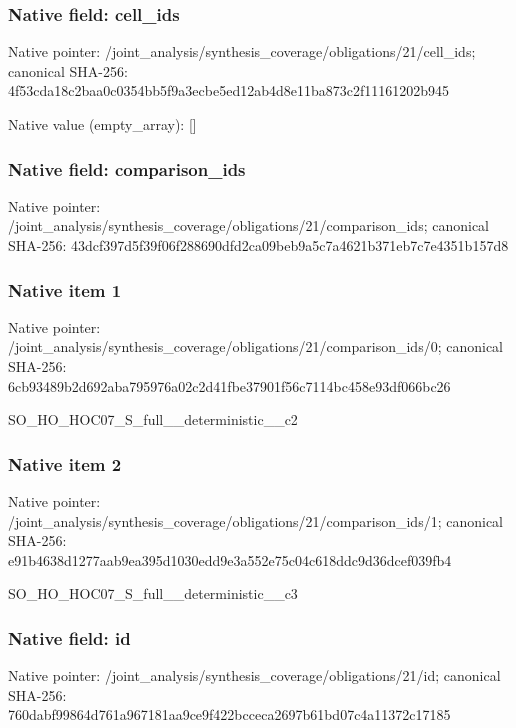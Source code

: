 \documentclass[10pt,a4paper]{article}
\begin{document}
\subsubsection{Native field: cell\_\allowbreak{}ids}
Native pointer: /joint\_\allowbreak{}analysis/synthesis\_\allowbreak{}coverage/obligations/21/cell\_\allowbreak{}ids; canonical SHA-256: 4f53cda18c2baa0c0354bb5f9a3ecbe5ed12ab4d8e11ba873c2f11161202b945

Native value (empty\_\allowbreak{}array): []

\subsubsection{Native field: comparison\_\allowbreak{}ids}
Native pointer: /joint\_\allowbreak{}analysis/synthesis\_\allowbreak{}coverage/obligations/21/comparison\_\allowbreak{}ids; canonical SHA-256: 43dcf397d5f39f06f288690dfd2ca09beb9a5c7a4621b371eb7c7e4351b157d8

\subsubsection{Native item 1}
Native pointer: /joint\_\allowbreak{}analysis/synthesis\_\allowbreak{}coverage/obligations/21/comparison\_\allowbreak{}ids/0; canonical SHA-256: 6cb93489b2d692aba795976a02c2d41fbe37901f56c7114bc458e93df066bc26

\begingroup\raggedright\sloppy SO\_\allowbreak{}HO\_\allowbreak{}HOC07\_\allowbreak{}S\_\allowbreak{}full\_\allowbreak{}\_\allowbreak{}deterministic\_\allowbreak{}\_\allowbreak{}c2\par\endgroup

\subsubsection{Native item 2}
Native pointer: /joint\_\allowbreak{}analysis/synthesis\_\allowbreak{}coverage/obligations/21/comparison\_\allowbreak{}ids/1; canonical SHA-256: e91b4638d1277aab9ea395d1030edd9e3a552e75c04c618ddc9d36dcef039fb4

\begingroup\raggedright\sloppy SO\_\allowbreak{}HO\_\allowbreak{}HOC07\_\allowbreak{}S\_\allowbreak{}full\_\allowbreak{}\_\allowbreak{}deterministic\_\allowbreak{}\_\allowbreak{}c3\par\endgroup

\subsubsection{Native field: id}
Native pointer: /joint\_\allowbreak{}analysis/synthesis\_\allowbreak{}coverage/obligations/21/id; canonical SHA-256: 760dabf99864d761a967181aa9ce9f422bcceca2697b61bd07c4a11372c17185
\end{document}

